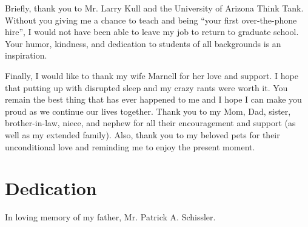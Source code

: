 \documentclass[final]{ua-thesis}
\numberwithin{equation}{section}
\begin{document}
Briefly, thank you to Mr. Larry Kull and the University of Arizona Think Tank. Without you giving me a chance to teach and being ``your first over-the-phone hire'', I would not have been able to leave my job to return to graduate school. Your humor, kindness, and dedication to students of all backgrounds is an inspiration.

Finally, I would like to thank my wife Marnell for her love and support. I hope that putting up with disrupted sleep and my crazy rants were worth it. You remain the best thing that has ever happened to me and I hope I can make you proud as we continue our lives together. Thank you to my Mom, Dad, sister, brother-in-law, niece, and nephew for all their encouragement and support (as well as my extended family). Also, thank you to my beloved pets for their unconditional love and reminding me to enjoy the present moment.

\chapter*{Dedication}
\thispagestyle{topright}
\begin{center}In loving memory of my father, Mr. Patrick A. Schissler.\end{center}


\tableofcontents

\listoffigures
\listoftables
\end{document}
